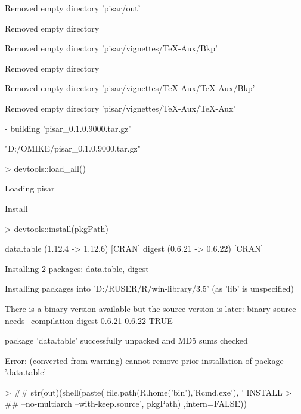 \documentclass[a4paper,12pt]{article}\usepackage[]{graphicx}\usepackage[]{color}
\begin{document}
\begin{Schunk}
\begin{Soutput}
   Removed empty directory 'pisar/out'

  
Removed empty directory 
  
   Removed empty directory 'pisar/vignettes/TeX-Aux/Bkp'

  
Removed empty directory 
  
   Removed empty directory 'pisar/vignettes/TeX-Aux/TeX-Aux/Bkp'

  
   Removed empty directory 'pisar/vignettes/TeX-Aux/TeX-Aux'

  
  
  
-  building 'pisar_0.1.0.9000.tar.gz'

  
   


\end{Soutput}
\begin{Soutput}
[1] "D:/OMIKE/pisar_0.1.0.9000.tar.gz"
\end{Soutput}
\begin{Sinput}
> devtools::load_all()
\end{Sinput}
\begin{Soutput}
Loading pisar
\end{Soutput}
\end{Schunk}



Install

\begin{Schunk}
\begin{Sinput}
> devtools::install(pkgPath)
\end{Sinput}
\begin{Soutput}
data.table (1.12.4 -> 1.12.6) [CRAN]
digest     (0.6.21 -> 0.6.22) [CRAN]
\end{Soutput}
\begin{Soutput}
Installing 2 packages: data.table, digest
\end{Soutput}
\begin{Soutput}
Installing packages into 'D:/RUSER/R/win-library/3.5'
(as 'lib' is unspecified)
\end{Soutput}
\begin{Soutput}

  There is a binary version available but the source version
  is later:
       binary source needs_compilation
digest 0.6.21 0.6.22              TRUE

package 'data.table' successfully unpacked and MD5 sums checked
\end{Soutput}
\begin{Soutput}
Error: (converted from warning) cannot remove prior installation of package 'data.table'
\end{Soutput}
\begin{Sinput}
> ## str(out)(shell(paste( file.path(R.home('bin'),'Rcmd.exe'), ' INSTALL
> ## --no-multiarch --with-keep.source', pkgPath) ,intern=FALSE))
\end{Sinput}
\end{Schunk}
\end{document}

